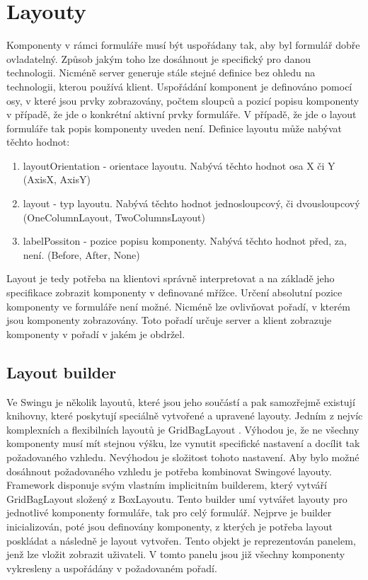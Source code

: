 \section{Layouty}
Komponenty v rámci formuláře musí být uspořádany tak, aby byl formulář dobře ovladatelný. Způsob jakým toho lze dosáhnout je specifický pro danou technologii. Nicméně server generuje stále stejné definice bez ohledu na technologii, kterou používá klient. Uspořádání komponent je definováno pomocí osy, v které jsou prvky zobrazovány, počtem sloupců a pozicí popisu komponenty v případě, že jde o konkrétní aktivní prvky formuláře. V případě, že jde o layout formuláře tak popis komponenty uveden není. Definice layoutu může nabývat těchto hodnot:
\begin{enumerate}
\item layoutOrientation - orientace layoutu. Nabývá těchto hodnot osa X či Y (AxisX, AxisY)
\item layout - typ layoutu. Nabývá těchto hodnot jednosloupcový, či dvousloupcový (OneColumnLayout, TwoColumnsLayout)
\item labelPossiton - pozice popisu komponenty. Nabývá těchto hodnot před, za, není. (Before, After, None)
\end{enumerate}
Layout je tedy potřeba na klientovi správně interpretovat a na základě jeho specifikace zobrazit komponenty v definované mřížce. Určení absolutní pozice komponenty ve formuláře není možné. Nicméně lze ovlivňovat pořadí, v kterém jsou komponenty zobrazovány. Toto pořadí určuje server a klient zobrazuje komponenty v pořadí v jakém je obdržel. 
\subsection{Layout builder}
Ve Swingu je několik layoutů, které jsou jeho součástí a pak samozřejmě existují knihovny, které poskytují speciálně vytvořené a upravené layouty. Jedním z nejvíc komplexních a flexibilních layoutů je GridBagLayout \cite{gridBagLayout}. Výhodou je, že ne všechny komponenty musí mít stejnou výšku, lze vynutit specifické nastavení a docílit tak požadovaného vzhledu. Nevýhodou je složitost tohoto nastavení. Aby bylo možné dosáhnout požadovaného vzhledu je potřeba kombinovat Swingové layouty. Framework disponuje svým vlastním implicitním builderem, který vytváří GridBagLayout složený z BoxLayoutu. Tento builder umí vytvářet layouty pro jednotlivé komponenty formuláře, tak pro celý formulář. Nejprve je builder inicializován, poté jsou definovány komponenty, z kterých je potřeba layout poskládat a následně je layout vytvořen. Tento objekt je reprezentován panelem, jenž lze vložit zobrazit uživateli. V tomto panelu jsou již všechny komponenty vykresleny a uspořádány v požadovaném pořadí. 

